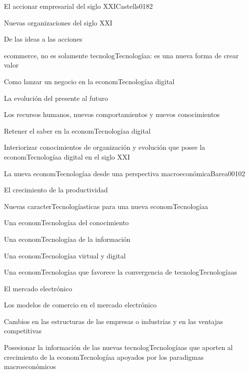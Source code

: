 \begin{syllabus}
\begin{unit}{El accionar empresarial del siglo XXI}{Castells01}{8}{2}
   \begin{topics}
      \item Nuevas organizaciones del siglo XXI
	\item De las ideas a las acciones
	\item ecommerce, no es solamente tecnologTecnologíaa: es una nueva forma de crear valor
	\item Como lanzar un negocio en la economTecnologíaa digital
	\item La evolución del presente al futuro
	\item Los recursos humanos, nuevos comportamientos y nuevos conocimientos
	\item Retener el saber en la economTecnologíaa digital
   \end{topics}

   \begin{unitgoals}
      \item Interiorizar conocimientos de organización y evolución que posee la economTecnologíaa digital en el siglo XXI
   \end{unitgoals}
\end{unit}

\begin{unit}{La nueva economTecnologíaa desde una perspectiva macroeconómica}{Barea00}{10}{2}
   \begin{topics}
      \item El crecimiento de la productividad
	\item Nuevas caracterTecnologíasticas para una nueva economTecnologíaa
	\item Una economTecnologíaa del conocimiento
	\item Una economTecnologíaa de la información
	\item Una economTecnologíaa virtual y digital
	\item Una economTecnologíaa que favorece la convergencia de tecnologTecnologíaas
	\item El mercado electrónico
	\item Los modelos de comercio en el mercado electrónico
	\item Cambios en las estructuras de las empresas o industrias y en las ventajas competitivas
  \end{topics}

   \begin{unitgoals}
      \item Posesionar la información de las nuevas tecnologTecnologíaas que aporten al crecimiento de la economTecnologíaa apoyados por los paradigmas macroeconómicos
   \end{unitgoals}
\end{unit}


\end{syllabus}
